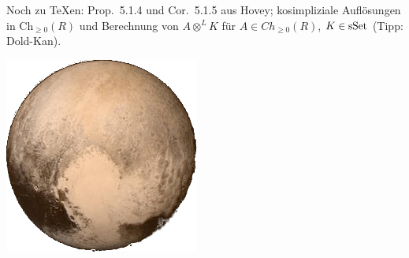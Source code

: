 \documentclass{uebblatt}
\newcommand{\Ch}{\mathrm{Ch}}
\begin{document}
Noch zu \TeX en: Prop.~5.1.4 und Cor.~5.1.5 aus Hovey; kosimpliziale
Auflösungen in $\Ch_{\geq0}(R)$ und Berechnung von $A \otimes^L K$
für $A \in Ch_{\geq0}(R)$, $K \in \mathrm{sSet}$ (Tipp: Dold-Kan).

\vfill
\centering
\href{https://www.nasa.gov/mission_pages/newhorizons/images/index.html}{\includegraphics[scale=0.4]{images/pluto}}
\par
\end{document}
